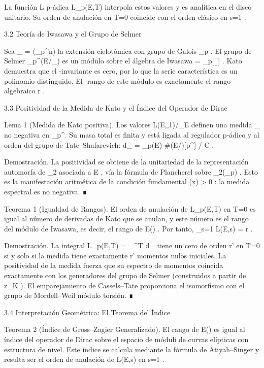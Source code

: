\documentclass[12pt,a4paper]{book}
\begin{document}
La función L p‑ádica  L_p(E,T)  interpola estos valores y es analítica en el disco unitario. Su orden de anulación en  T=0  coincide con el orden clásico en  s=1 .

3.2 Teoría de Iwasawa y el Grupo de Selmer

Sea  _{\infty} = \bigcup {}(\mu_{p^n})  la extensión ciclotómica con grupo de Galois  \Gamma \cong {}_p . El grupo de Selmer  _{p^\infty}(E/_{\infty})  es un módulo sobre el álgebra de Iwasawa  \Lambda = _p[[\Gamma]] . Kato demuestra que el  \mu -invariante es cero, por lo que la serie característica es un polinomio distinguido. El  \Lambda -rango de este módulo es exactamente el rango algebraico  r .

3.3 Positividad de la Medida de Kato y el Índice del Operador de Dirac

Lema 1 (Medida de Kato positiva).
Los valores  L(E,\chi,1)/\Omega_E  definen una medida  \mu_{}  no negativa en  _p^\times . Su masa total es finita y está ligada al regulador p‑ádico y al orden del grupo de Tate–Shafarevich:  \int d\mu_{} = _p(E) \cdot \#(E/)[p^\infty] / C .

Demostración. La positividad se obtiene de la unitariedad de la representación automorfa de  _2  asociada a  E , vía la fórmula de Plancherel sobre  _2(_p) . Esto es la manifestación aritmética de la condición fundamental  \rho(x) > 0 : la medida espectral es no negativa. ∎

Teorema 1 (Igualdad de Rangos).
El orden de anulación de  L_p(E,T)  en  T=0  es igual al número de derivadas de Kato que se anulan, y este número es el rango del módulo de Iwasawa, es decir, el rango de  E() . Por tanto,  _{s=1} L(E,s) = r .

Demostración. La integral  L_p(E,T) = \int \chi_{}^T d\mu_{}  tiene un cero de orden  r'  en  T=0  si y solo si la medida tiene exactamente  r'  momentos nulos iniciales. La positividad de la medida fuerza que su espectro de momentos coincida exactamente con los generadores del grupo de Selmer (construidos a partir de  z_K ). El emparejamiento de Cassels–Tate proporciona el isomorfismo con el grupo de Mordell–Weil módulo torsión. ∎

3.4 Interpretación Geométrica: El Teorema del Índice

Teorema 2 (Índice de Gross–Zagier Generalizado).
El rango de  E()  es igual al índice del operador de Dirac sobre el espacio de móduli de curvas elípticas con estructura de nivel. Este índice se calcula mediante la fórmula de Atiyah–Singer y resulta ser el orden de anulación de  L(E,s)  en  s=1 .
\end{document}
